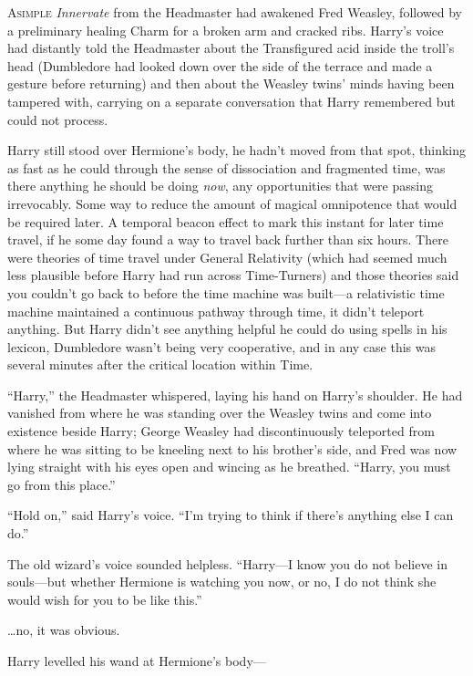 
\lettrine{A}{simple} \emph{Innervate} from the Headmaster had awakened Fred Weasley, followed by a preliminary healing Charm for a broken arm and cracked ribs. Harry’s voice had distantly told the Headmaster about the Transfigured acid inside the troll’s head (Dumbledore had looked down over the side of the terrace and made a gesture before returning) and then about the Weasley twins’ minds having been tampered with, carrying on a separate conversation that Harry remembered but could not process.

Harry still stood over Hermione’s body, he hadn’t moved from that spot, thinking as fast as he could through the sense of dissociation and fragmented time, was there anything he should be doing \emph{now}, any opportunities that were passing irrevocably. Some way to reduce the amount of magical omnipotence that would be required later. A temporal beacon effect to mark this instant for later time travel, if he some day found a way to travel back further than six hours. There were theories of time travel under General Relativity (which had seemed much less plausible before Harry had run across Time-Turners) and those theories said you couldn’t go back to before the time machine was built—a relativistic time machine maintained a continuous pathway through time, it didn’t teleport anything. But Harry didn’t see anything helpful he could do using spells in his lexicon, Dumbledore wasn’t being very cooperative, and in any case this was several minutes after the critical location within Time.

“Harry,” the Headmaster whispered, laying his hand on Harry’s shoulder. He had vanished from where he was standing over the Weasley twins and come into existence beside Harry; George Weasley had discontinuously teleported from where he was sitting to be kneeling next to his brother’s side, and Fred was now lying straight with his eyes open and wincing as he breathed.
“Harry, you must go from this place.”

“Hold on,” said Harry’s voice.
“I’m trying to think if there’s anything else I can do.”

The old wizard’s voice sounded helpless.
“Harry—I know you do not believe in souls—but whether Hermione is watching you now, or no, I do not think she would wish for you to be like this.”

…no, it was obvious.

Harry levelled his wand at Hermione’s body—

